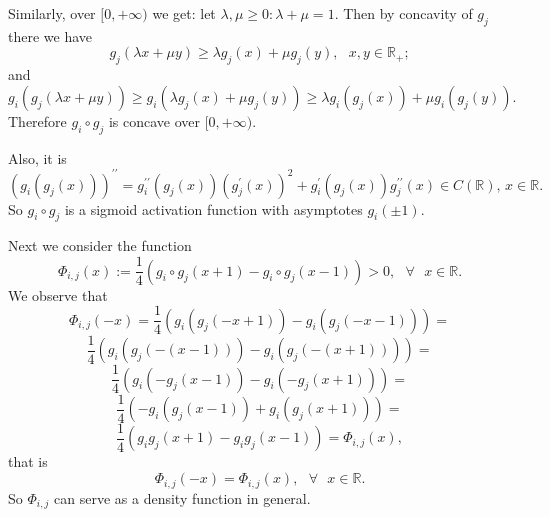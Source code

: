 \documentclass[10pt]{NSP1}
\numberwithin{equation}{section}
\begin{document}
Similarly, over $[0,+\infty )$ we get: let $\lambda ,\mu \geq 0:\lambda +\mu
=1$. Then by concavity of $g_{j}$ there we have
\begin{equation*}
g_{j}\left( \lambda x+\mu y\right) \geq \lambda g_{j}\left( x\right) +\mu
g_{j}\left( y\right) ,\text{ \ }x,y\in \mathbb{R}_{+};
\end{equation*}
and
\begin{equation*}
g_{i}\left( g_{j}\left( \lambda x+\mu y\right) \right) \geq g_{i}\left(
\lambda g_{j}\left( x\right) +\mu g_{j}\left( y\right) \right) \geq \lambda
g_{i}\left( g_{j}\left( x\right) \right) +\mu g_{i}\left( g_{j}\left(
y\right) \right) .
\end{equation*}
Therefore $g_{i}\circ g_{j}$ is concave over $[0,+\infty ).$

Also, it is
\begin{equation*}
(g_{i}\left( g_{j}\left( x\right) \right) )^{\prime \prime }=g_{i}^{\prime
\prime }\left( g_{j}\left( x\right) \right) \left( g_{j}^{\prime }\left(
x\right) \right) ^{2}+g_{i}^{\prime }\left( g_{j}\left( x\right) \right)
g_{j}^{\prime \prime }\left( x\right) \in C\left( \mathbb{R}\right) \text{,
\ }x\in \mathbb{R}.
\end{equation*}
So $g_{i}\circ g_{j}$ is a sigmoid activation function with asymptotes $%
g_{i}\left( \pm 1\right) $.

Next we consider the function
\begin{equation*}
\Phi _{i,j}\left( x\right) :=\frac{1}{4}\left( g_{i}\circ g_{j}\left(
x+1\right) -g_{i}\circ g_{j}\left( x-1\right) \right) >0,\text{ \ }\forall
\text{ }x\in \mathbb{R}.
\end{equation*}
We observe that
\begin{equation*}
\Phi _{i,j}\left( -x\right) =\frac{1}{4}\left( g_{i}\left( g_{j}\left(
-x+1\right) \right) -g_{i}\left( g_{j}\left( -x-1\right) \right) \right) =
\end{equation*}
\begin{equation*}
\frac{1}{4}\left( g_{i}\left( g_{j}\left( -\left( x-1\right) \right) \right)
-g_{i}\left( g_{j}\left( -\left( x+1\right) \right) \right) \right) =
\end{equation*}
\begin{equation*}
\frac{1}{4}\left( g_{i}\left( -g_{j}\left( x-1\right) \right) -g_{i}\left(
-g_{j}\left( x+1\right) \right) \right) =
\end{equation*}
\begin{equation*}
\frac{1}{4}\left( -g_{i}\left( g_{j}\left( x-1\right) \right) +g_{i}\left(
g_{j}\left( x+1\right) \right) \right) =
\end{equation*}
\begin{equation*}
\frac{1}{4}\left( g_{i}g_{j}\left( x+1\right) -g_{i}g_{j}\left( x-1\right)
\right) =\Phi _{i,j}\left( x\right) ,
\end{equation*}
that is
\begin{equation*}
\Phi _{i,j}\left( -x\right) =\Phi _{i,j}\left( x\right) ,\text{ \ }\forall
\text{ }x\in \mathbb{R}.
\end{equation*}
So $\Phi _{i,j}$ can serve as a density function in general.
\end{document}
